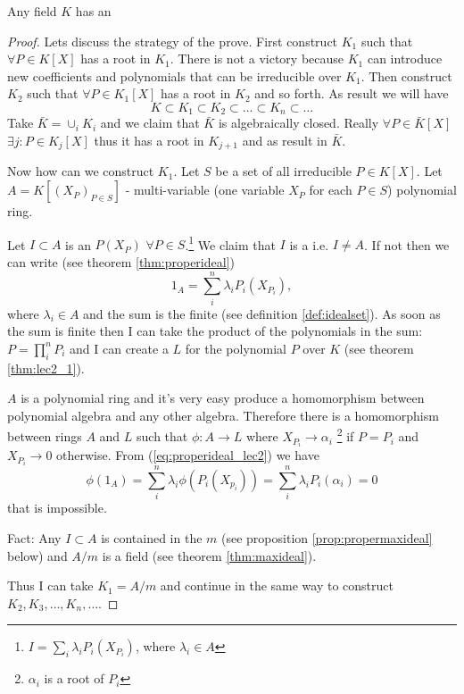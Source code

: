 \begin{theorem}
  Any field $K$ has an 
  \begin{proof}
    Lets discuss the strategy of the prove.
    First construct $K_1$ such that $\forall P \in K\left[X\right]$
    has a root in $K_1$. There is not a victory because $K_1$ can
    introduce new coefficients and polynomials that can be irreducible
    over $K_1$. Then construct $K_2$ such that $\forall P \in
    K_1\left[X\right]$ has a root in $K_2$ and so forth. As result we
    will have
    \[
    K \subset K_1 \subset K_2 \subset \dots \subset K_n \subset \dots
    \]
    Take $\bar{K} = \cup_i K_i$ and we claim that $\bar{K}$ is
    algebraically closed. Really
    $\forall P \in \bar{K}\left[X\right]$ $\exists j: P \in
    K_j\left[X\right]$ thus it has a root in $K_{j+1}$ and as result
    in $\bar{K}$.

    Now how can we construct $K_1$. Let $S$ be a set of all
    irreducible $P \in K\left[X\right]$. Let
    $A = K\left[\left(X_P\right)_{P \in S}\right]$ - multi-variable
    (one variable $X_P$ for each $P \in S$) polynomial ring.

    Let $I \subset A$ is an  $P\left(X_P\right)$
    $\forall P \in S$.\footnote
    {
      $I = \sum_i \lambda_i P_i\left(X_{P_i}\right)$, where $\lambda_i \in A$
    }
    We claim that $I$ is a  i.e. $I \ne
    A$. If not then we can write (see theorem \ref{thm:properideal})
    \begin{equation}
      1_A = \sum_i^n \lambda_i P_i\left(X_{P_i}\right),
      \label{eq:properideal_lec2}
    \end{equation}
    where $\lambda_i \in A$ and the sum is the finite
    (see definition \ref{def:idealset}).
    As soon as the
    sum is finite then I can take the product of the polynomials in
    the sum: $P = \prod_i^n P_i$ and I can create a
     $L$ for the polynomial $P$ over $K$
    (see theorem \ref{thm:lec2_1}).

    $A$ is a polynomial ring and it's very easy produce a homomorphism
    between polynomial algebra and any other algebra. Therefore there
    is a homomorphism between rings $A$ and $L$ such that 
    $\phi: A \to L$ where $X_{P_i} \to \alpha_i$
    \footnote{$\alpha_i$ is a root of $P_i$}
    if $P =P_i$ and
    $X_{P_i} \to 0$ otherwise. From (\ref{eq:properideal_lec2}) we
    have
    \[
    \phi(1_A) = \sum_i^n \lambda_i
    \phi\left(P_i\left(X_{p_i}\right)\right) =
    \sum_i^n \lambda_i P_i\left(\alpha_i\right) = 0
    \]
    that is impossible.

    Fact: Any  $I \subset A$ is contained in
    the  $m$ (see proposition
    \ref{prop:propermaxideal} below) and $A/m$ is a field (see theorem
    \ref{thm:maxideal}).

    Thus I can take $K_1 = A/m$ and continue in the same way to
    construct $K_2, K_3, \dots, K_n, \dots$.
  \end{proof}
  \label{thm:lec2_2}
\end{theorem}


